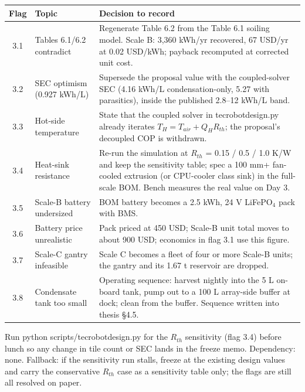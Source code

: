 \documentclass[11pt,a4paper]{article}
\newcommand{\f}[1]{{\ttfamily\def\_{\textunderscore\allowbreak}#1}}
\begin{document}
\begin{center}
\small
\renewcommand{\arraystretch}{1.25}
\begin{longtable}{@{}clp{9.2cm}@{}}
\toprule
\textbf{Flag} & \textbf{Topic} & \textbf{Decision to record} \\
\midrule
\endhead
3.1 & Tables 6.1/6.2 contradict & Regenerate Table 6.2 from the Table 6.1 soiling model. Scale B: 3{,}360 kWh/yr recovered, 67 USD/yr at 0.02 USD/kWh; payback recomputed at corrected unit cost. \\
3.2 & SEC optimism (0.927 kWh/L) & Supersede the proposal value with the coupled-solver SEC (4.16 kWh/L condensation-only, 5.27 with parasitics), inside the published 2.8--12 kWh/L band. \\
3.3 & Hot-side temperature & State that the coupled solver in \f{tec\_robot\_design.py} already iterates $T_H = T_{air} + Q_H R_{th}$; the proposal's decoupled COP is withdrawn. \\
3.4 & Heat-sink resistance & Re-run the simulation at $R_{th}$ = 0.15 / 0.5 / 1.0 K/W and keep the sensitivity table; spec a 100 mm+ fan-cooled extrusion (or CPU-cooler class sink) in the full-scale BOM. Bench measures the real value on Day 3. \\
3.5 & Scale-B battery undersized & BOM battery becomes a 2.5 kWh, 24 V LiFePO$_4$ pack with BMS. \\
3.6 & Battery price unrealistic & Pack priced at 450 USD; Scale-B unit total moves to about 900 USD; economics in flag 3.1 use this figure. \\
3.7 & Scale-C gantry infeasible & Scale C becomes a fleet of four or more Scale-B units; the gantry and its 1.67 t reservoir are dropped. \\
3.8 & Condensate tank too small & Operating sequence: harvest nightly into the 5 L on-board tank, pump out to a 100 L array-side buffer at dock; clean from the buffer. Sequence written into thesis \S4.5. \\
\bottomrule
\end{longtable}
\end{center}

Run \f{python scripts/tec\_robot\_design.py} for the $R_{th}$ sensitivity
(flag 3.4) before lunch so any change in tile count or SEC lands in the freeze
memo. Dependency: none. Fallback: if the sensitivity run stalls, freeze at the
existing design values and carry the conservative $R_{th}$ case as a
sensitivity table only; the flags are still all resolved on paper.
\end{document}
